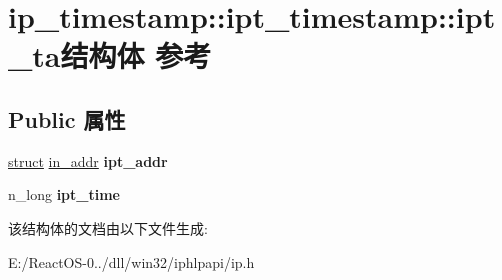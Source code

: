 \hypertarget{structip__timestamp_1_1ipt__timestamp_1_1ipt__ta}{}\section{ip\+\_\+timestamp\+:\+:ipt\+\_\+timestamp\+:\+:ipt\+\_\+ta结构体 参考}
\label{structip__timestamp_1_1ipt__timestamp_1_1ipt__ta}
\subsection*{Public 属性}
\begin{DoxyCompactItemize}
\item 
\mbox{\label{structip__timestamp_1_1ipt__timestamp_1_1ipt__ta_a8ec80581dfc8435e6a746cdb528f7208}} 
\hyperlink{interfacestruct}{struct} \hyperlink{structin__addr}{in\+\_\+addr} {\bfseries ipt\+\_\+addr}
\item 
\mbox{\label{structip__timestamp_1_1ipt__timestamp_1_1ipt__ta_a4a029c5c4b19e3510ce44fe88fb1c754}} 
n\+\_\+long {\bfseries ipt\+\_\+time}
\end{DoxyCompactItemize}


该结构体的文档由以下文件生成\+:\begin{DoxyCompactItemize}
\item 
E\+:/\+React\+O\+S-\/0../dll/win32/iphlpapi/ip.\+h\end{DoxyCompactItemize}
